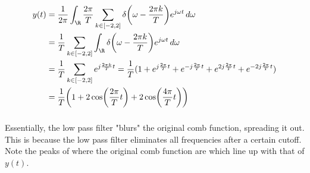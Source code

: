 \documentclass{article}
\begin{document}
\begin{align}
    y(t) &= \frac{1}{2\pi} \int_{\R} \frac{2\pi}{T} \sum_{k \in [-2, 2]} \delta\qty(\omega - \frac{2\pi k}{T}) e^{j \omega t} \, d\omega \\
    &= \frac{1}{T} \sum_{k \in [-2, 2]} \int_{\R} \delta\qty(\omega - \frac{2\pi k}{T}) e^{j \omega t} \, d\omega \\
    &= \frac{1}{T} \sum_{k \in [-2, 2]} e^{j \frac{2\pi k}{T} t} = \frac{1}{T} (1 + e^{j \frac{2\pi}{T} t} + e^{-j \frac{2\pi}{T} t} + e^{2j \frac{2\pi}{T} t} + e^{-2j \frac{2\pi}{T} t}) \\
    &= \frac{1}{T} \qty(1 + 2\cos(\frac{2\pi}{T} t) + 2\cos(\frac{4\pi}{T} t))
\end{align}

\subsubsection{}

\begin{center}
\end{center}
Essentially, the low pass filter "blurs" the original comb function, spreading it out.
This is because the low pass filter eliminates all frequencies after a certain cutoff.
Note the peaks of where the original comb function are which line up with that of \(y(t)\).
\end{document}
